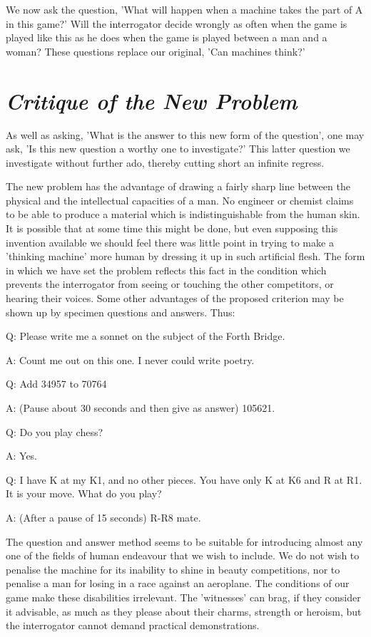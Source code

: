 \documentclass[12pt]{article}
\begin{document}
    We now ask the question, 'What will happen when a machine takes the part of A in this game?' Will the interrogator decide wrongly as often when the game is played like this as he does when the game is played between a man and a woman? These questions replace our original, 'Can machines think?'

    \section{\textit{Critique of the New Problem}}
    As well as asking, 'What is the answer to this new form of the question', one may ask, 'Is this new question a worthy one to investigate?' This latter question we investigate without further ado, thereby cutting short an infinite regress.

    The new problem has the advantage of drawing a fairly sharp line between the physical and the intellectual capacities of a man. No engineer or chemist claims to be able to produce a material which is indistinguishable from the human skin. It is possible that at some time this might be done, but even supposing this invention available we should feel there was little point in trying to make a 'thinking machine' more human by dressing it up in such artificial flesh. The form in which we have set the problem reflects this fact in the condition which prevents the interrogator from seeing or touching the other competitors, or hearing their voices. Some other advantages of the proposed criterion may be shown up by specimen questions and answers. Thus:
    \vspace{\baselineskip}

    Q: Please write me a sonnet on the subject of the Forth Bridge.

    A: Count me out on this one. I never could write poetry.

    Q: Add 34957 to 70764

    A: (Pause about 30 seconds and then give as answer) 105621.

    Q: Do you play chess?

    A: Yes.

    Q: I have K at my K1, and no other pieces. You have only K at K6 and R at R1. It is your move. What do you play?

    A: (After a pause of 15 seconds) R-R8 mate.

    \vspace{\baselineskip}
    The question and answer method seems to be suitable for introducing almost any one of the fields of human endeavour that we wish to include. We do not wish to penalise the machine for its inability to shine in beauty competitions, nor to penalise a man for losing in a race against an aeroplane. The conditions of our game make these disabilities irrelevant. The 'witnesses' can brag, if they consider it advisable, as much as they please about their charms, strength or heroism, but the interrogator cannot demand practical demonstrations.
\end{document}
